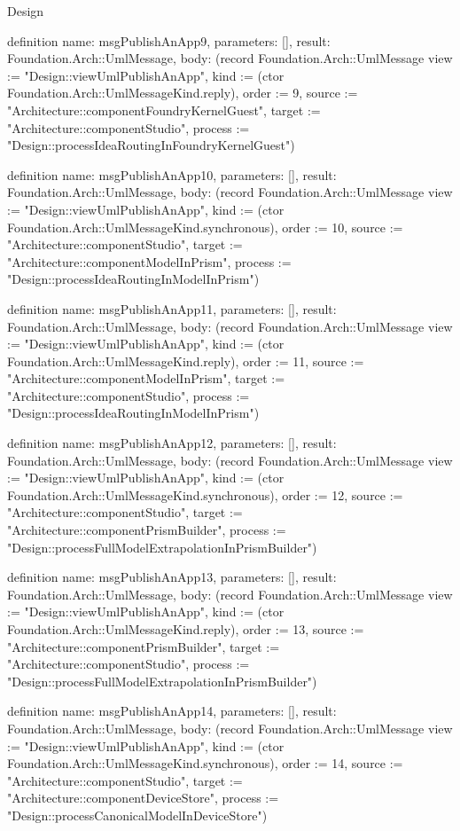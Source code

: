 \begin{lexlean}{Design}
\begin{semanticmodule}
definition{
  name: msgPublishAnApp9,
  parameters: [],
  result: Foundation.Arch::UmlMessage,
  body: (record Foundation.Arch::UmlMessage {view := "Design::viewUmlPublishAnApp", kind := (ctor Foundation.Arch::UmlMessageKind.reply), order := 9, source := "Architecture::componentFoundryKernelGuest", target := "Architecture::componentStudio", process := "Design::processIdeaRoutingInFoundryKernelGuest"})
}

definition{
  name: msgPublishAnApp10,
  parameters: [],
  result: Foundation.Arch::UmlMessage,
  body: (record Foundation.Arch::UmlMessage {view := "Design::viewUmlPublishAnApp", kind := (ctor Foundation.Arch::UmlMessageKind.synchronous), order := 10, source := "Architecture::componentStudio", target := "Architecture::componentModelInPrism", process := "Design::processIdeaRoutingInModelInPrism"})
}

definition{
  name: msgPublishAnApp11,
  parameters: [],
  result: Foundation.Arch::UmlMessage,
  body: (record Foundation.Arch::UmlMessage {view := "Design::viewUmlPublishAnApp", kind := (ctor Foundation.Arch::UmlMessageKind.reply), order := 11, source := "Architecture::componentModelInPrism", target := "Architecture::componentStudio", process := "Design::processIdeaRoutingInModelInPrism"})
}

definition{
  name: msgPublishAnApp12,
  parameters: [],
  result: Foundation.Arch::UmlMessage,
  body: (record Foundation.Arch::UmlMessage {view := "Design::viewUmlPublishAnApp", kind := (ctor Foundation.Arch::UmlMessageKind.synchronous), order := 12, source := "Architecture::componentStudio", target := "Architecture::componentPrismBuilder", process := "Design::processFullModelExtrapolationInPrismBuilder"})
}

definition{
  name: msgPublishAnApp13,
  parameters: [],
  result: Foundation.Arch::UmlMessage,
  body: (record Foundation.Arch::UmlMessage {view := "Design::viewUmlPublishAnApp", kind := (ctor Foundation.Arch::UmlMessageKind.reply), order := 13, source := "Architecture::componentPrismBuilder", target := "Architecture::componentStudio", process := "Design::processFullModelExtrapolationInPrismBuilder"})
}

definition{
  name: msgPublishAnApp14,
  parameters: [],
  result: Foundation.Arch::UmlMessage,
  body: (record Foundation.Arch::UmlMessage {view := "Design::viewUmlPublishAnApp", kind := (ctor Foundation.Arch::UmlMessageKind.synchronous), order := 14, source := "Architecture::componentStudio", target := "Architecture::componentDeviceStore", process := "Design::processCanonicalModelInDeviceStore"})
}


\end{semanticmodule}
\end{lexlean}
